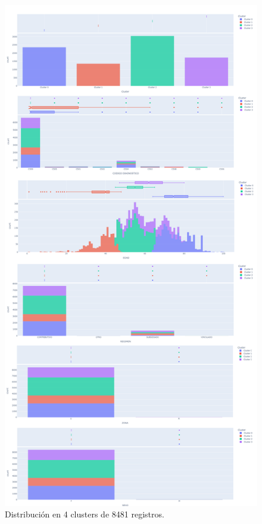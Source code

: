 \begin{figure}[h!]
	\centering
	\includegraphics[width=1
	\linewidth]{IMAGENES/Distribucion_Total}
	\caption{Distribución en 4 clusters de 8481 registros.}
	\label{distribucion_total}
\end{figure} 

